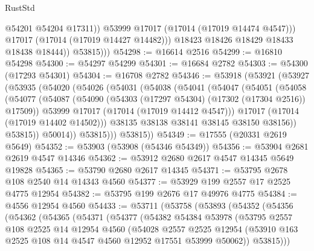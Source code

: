 \begin{lexlean}{RustStd}
\begin{coremodule}
                      @54201
                      @54204
                      @17311))
                  @53999
                  @17017
                  (@17014 (@17019 @14474 @4547)))
                @17017
                (@17014 (@17019 @14427 @14482)))
              @18423
              @18426
              @18429
              @18433
              @18438
              @18444))
          @53815)))
@54298 := @16614 @2516
@54299 := @16810 @54298
@54300 := @54297 @54299
@54301 := @16684 @2782
@54303 := @54300 (@17293 @54301)
@54304 := @16708 @2782
@54346 := @53918
    (@53921
      (@53927
        (@53935
          (@54020
            (@54026
              (@54031
                (@54038
                  (@54041
                    (@54047
                      (@54051
                        (@54058
                          (@54077
                            (@54087
                              (@54090 (@54303 (@17297 @54304) (@17302 (@17304 @2516)) @17509))
                              @53999
                              @17017
                              (@17014 (@17019 @14412 @4547)))
                            @17017
                            (@17014 (@17019 @14402 @14502)))
                          @38135
                          @38138
                          @38141
                          @38145
                          @38150
                          @38156))
                      @53815))
                  @50014))
              @53815)))
        @53815))
@54349 := @17555 (@20331 @2619 @5649)
@54352 := @53903 (@53908 (@54346 @54349))
@54356 := @53904 @2681 @2619 @4547 @14346
@54362 := @53912 @2680 @2617 @4547 @14345 @5649 @19828
@54365 := @53790 @2680 @2617 @14345
@54371 := @53795 @2678 @108 @2540 @14 @14343 @4560
@54377 := @53929 @199 @2557 @17 @2525 @4775 @12954
@54382 := @53795 @199 @2676 @17 @49976 @4775
@54384 := @4556 @12954 @4560
@54433 := @53711
    (@53758
      (@53893
        (@54352
          (@54356
            (@54362
              (@54365
                (@54371
                  (@54377
                    (@54382
                      @54384
                      @53978
                      (@53795
                        @2557
                        @108
                        @2525
                        @14
                        @12954
                        @4560
                        (@54028
                          @2557
                          @2525
                          @12954
                          (@53910 @163 @2525 @108 @14 @4547 @4560 @12952 @17551 @53999 @50062))
                        @53815)))

\end{coremodule}
\end{lexlean}
